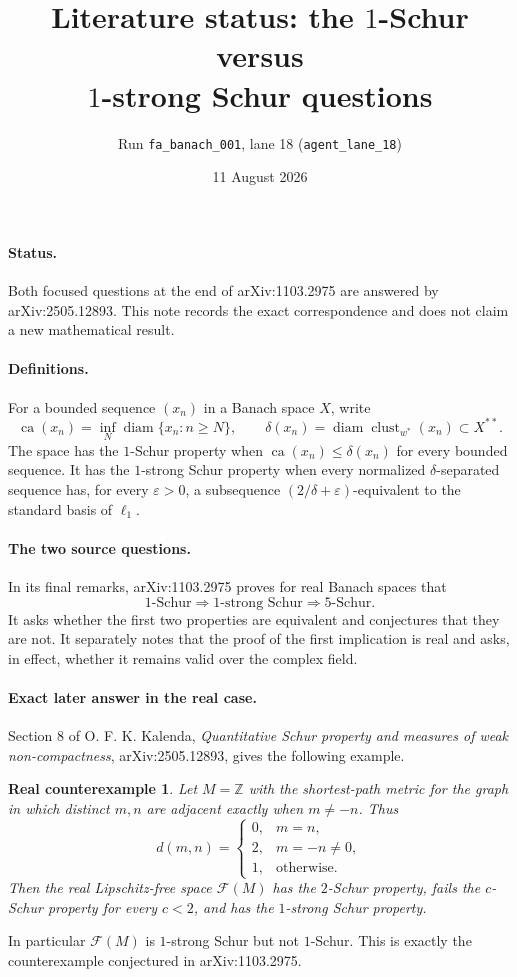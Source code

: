 \documentclass[11pt]{article}
\title{Literature status: the $1$-Schur versus\\$1$-strong Schur questions}
\author{Run \texttt{fa\_banach\_001}, lane 18 (\texttt{agent\_lane\_18})}
\date{11 August 2026}
\newtheorem*{answerA}{Real counterexample}
\begin{document}
\maketitle

\paragraph{Status.}
Both focused questions at the end of arXiv:1103.2975 are answered by
arXiv:2505.12893.  This note records the exact correspondence and does not
claim a new mathematical result.

\paragraph{Definitions.}
For a bounded sequence $(x_n)$ in a Banach space $X$, write
\[
 \operatorname{ca}(x_n)=\inf_N\operatorname{diam}\{x_n:n\geq N\},
 \qquad
 \delta(x_n)=\operatorname{diam}\operatorname{clust}_{w^*}(x_n)
 \subset X^{**}.
\]
The space has the $1$-Schur property when
$\operatorname{ca}(x_n)\leq\delta(x_n)$ for every bounded sequence.  It has
the $1$-strong Schur property when every normalized $\delta$-separated
sequence has, for every $\varepsilon>0$, a subsequence
$(2/\delta+\varepsilon)$-equivalent to the standard basis of $\ell_1$.

\paragraph{The two source questions.}
In its final remarks, arXiv:1103.2975 proves for real Banach spaces that
\[
 1\text{-Schur}\Longrightarrow 1\text{-strong Schur}
 \Longrightarrow 5\text{-Schur}.
\]
It asks whether the first two properties are equivalent and conjectures that
they are not.  It separately notes that the proof of the first implication is
real and asks, in effect, whether it remains valid over the complex field.

\paragraph{Exact later answer in the real case.}
Section 8 of O. F. K. Kalenda, \emph{Quantitative Schur property and measures
of weak non-compactness}, arXiv:2505.12893, gives the following example.
\begin{answerA}
Let $M=\mathbb Z$ with the shortest-path metric for the graph in which distinct
$m,n$ are adjacent exactly when $m\neq -n$.  Thus
\[
 d(m,n)=\begin{cases}
 0,&m=n,\\
 2,&m=-n\neq0,\\
 1,&\text{otherwise}.
 \end{cases}
\]
Then the real Lipschitz-free space $\mathcal F(M)$ has the $2$-Schur property,
fails the $c$-Schur property for every $c<2$, and has the $1$-strong Schur
property.
\end{answerA}
In particular $\mathcal F(M)$ is $1$-strong Schur but not $1$-Schur.  This is
exactly the counterexample conjectured in arXiv:1103.2975.
\end{document}
